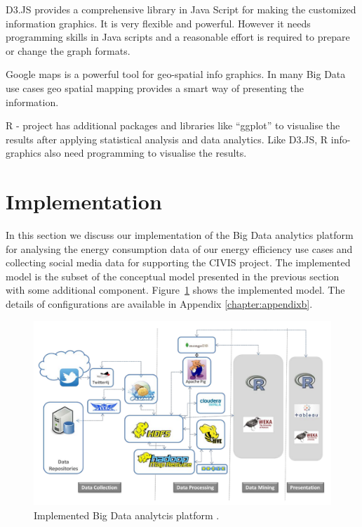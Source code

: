 D3.JS provides a comprehensive library in Java Script for making the customized information graphics. It is very flexible and powerful. However it needs programming skills in Java scripts and a reasonable effort is required to prepare or change the graph formats. 

Google maps is a powerful tool for geo-spatial info graphics. In many Big Data use cases geo spatial mapping provides a smart way of presenting the information.

R - project has additional packages and libraries like ``ggplot'' to visualise the results after applying statistical analysis and data analytics. Like D3.JS, R info-graphics also need programming to visualise the results.

\section{Implementation}  
In this section we discuss our implementation of the Big Data analytics platform for analysing the energy consumption data of our energy efficiency use cases and collecting social media data for supporting the CIVIS project. The implemented model is the subset of the conceptual model presented in the previous section with some additional component. Figure~\ref{fig:iplatform} shows the implemented model. The details of configurations are available in Appendix \ref{chapter:appendixb}.  
\begin{figure}[!ht]
    \begin{center}
      \includegraphics[width=\textwidth]{images/iplatform.pdf}
      \caption{Implemented Big Data analytcis platform .}
      \label{fig:iplatform}
    \end{center}
  \end{figure} 
